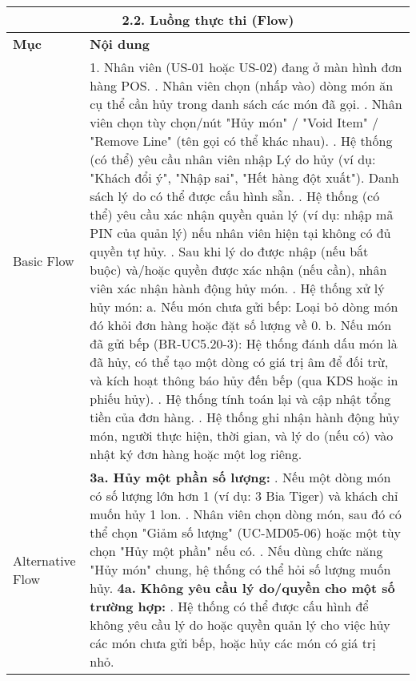 \begin{longtable}{|m{4cm}|p{11cm}|}
\hline
\multicolumn{2}{|c|}{\textbf{2.2. Luồng thực thi (Flow)}} \\
\hline
\textbf{Mục} & \textbf{Nội dung} \\
\hline
Basic Flow & 1. Nhân viên (US-01 hoặc US-02) đang ở màn hình đơn hàng POS. \newline 2. Nhân viên chọn (nhấp vào) dòng món ăn cụ thể cần hủy trong danh sách các món đã gọi. \newline 3. Nhân viên chọn tùy chọn/nút "Hủy món" / "Void Item" / "Remove Line" (tên gọi có thể khác nhau). \newline 4. Hệ thống (có thể) yêu cầu nhân viên nhập Lý do hủy (ví dụ: "Khách đổi ý", "Nhập sai", "Hết hàng đột xuất"). Danh sách lý do có thể được cấu hình sẵn. \newline 5. Hệ thống (có thể) yêu cầu xác nhận quyền quản lý (ví dụ: nhập mã PIN của quản lý) nếu nhân viên hiện tại không có đủ quyền tự hủy. \newline 6. Sau khi lý do được nhập (nếu bắt buộc) và/hoặc quyền được xác nhận (nếu cần), nhân viên xác nhận hành động hủy món. \newline 7. Hệ thống xử lý hủy món: \newline    a. Nếu món chưa gửi bếp: Loại bỏ dòng món đó khỏi đơn hàng hoặc đặt số lượng về 0. \newline    b. Nếu món đã gửi bếp (BR-UC5.20-3): Hệ thống đánh dấu món là đã hủy, có thể tạo một dòng có giá trị âm để đối trừ, và kích hoạt thông báo hủy đến bếp (qua KDS hoặc in phiếu hủy). \newline 8. Hệ thống tính toán lại và cập nhật tổng tiền của đơn hàng. \newline 9. Hệ thống ghi nhận hành động hủy món, người thực hiện, thời gian, và lý do (nếu có) vào nhật ký đơn hàng hoặc một log riêng. \\
\hline
Alternative Flow & \textbf{3a. Hủy một phần số lượng:} \newline    1. Nếu một dòng món có số lượng lớn hơn 1 (ví dụ: 3 Bia Tiger) và khách chỉ muốn hủy 1 lon. \newline    2. Nhân viên chọn dòng món, sau đó có thể chọn "Giảm số lượng" (UC-MD05-06) hoặc một tùy chọn "Hủy một phần" nếu có. \newline    3. Nếu dùng chức năng "Hủy món" chung, hệ thống có thể hỏi số lượng muốn hủy. \newline \textbf{4a. Không yêu cầu lý do/quyền cho một số trường hợp:} \newline    1. Hệ thống có thể được cấu hình để không yêu cầu lý do hoặc quyền quản lý cho việc hủy các món chưa gửi bếp, hoặc hủy các món có giá trị nhỏ. \\

\end{longtable}
